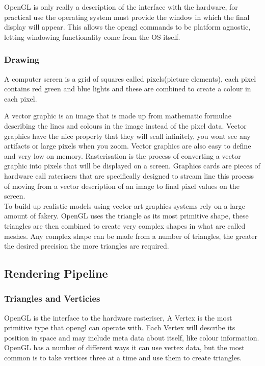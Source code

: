 OpenGL is only really a description of the interface with the hardware, for 
practical use the operating system must provide the window in which the final
display will appear. This allows the opengl commands to be platform agnostic, 
letting windowing functionality come from the OS itself.\\

\subsubsection*{Drawing}
A computer screen is a grid of squares called pixels(picture elements), each
pixel contains red green and blue lights and these are combined to create a 
colour in each pixel. 

A vector graphic is an image that is made up from mathematic formulae describing
the lines and colours in the image instead of the pixel data. Vector graphics
have the nice property that they will scall infinitely, you wont see any 
artifacts or large pixels when you zoom. Vector graphics are also easy to define
and very low on memory. Rasterisation is the process of converting a vector 
graphic into pixels that will be displayed on a screen. Graphics cards are 
pieces of hardware call raterisers that are specifically designed to stream line
this process of moving from a vector description of an image to final pixel 
values on the screen.\\

To build up realistic models using vector art graphics systems rely on a large
amount of fakery. OpenGL uses the triangle as its most primitive shape, these
triangles are then combined to create very complex shapes in what are called 
meshes. Any complex shape can be made from a number of triangles, the greater the
desired precision the more triangles are required.\\

\subsection{Rendering Pipeline}
\subsubsection{Triangles and Verticies}
OpenGL is the interface to the hardware rasteriser, A Vertex is the most 
primitive type that opengl can operate with. Each Vertex will describe its 
position in space and may include meta data about itself, like colour 
information. OpenGL has a number of different ways it can use vertex data, but 
the most common is to take vertices three at a time and use them to create 
triangles.\\

